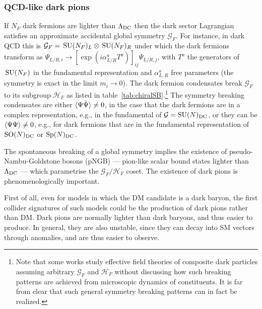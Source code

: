 \subsubsection{QCD-like dark pions}\label{sec:darkpi}
If $N_F$ dark fermions are lighter than $\Lambda_{\rm DC}$ then the dark sector Lagrangian satisfies an approximate accidental global symmetry $\mathcal{G}_F$. For instance, in dark QCD this is $\mathcal{G}_F=\,{\rm SU}(N_F)_L\otimes \,{\rm SU}(N_F)_R$ under which the dark fermions transform as $\Psi_{L/R,i} \to [\exp(i \alpha_{L/R}^a T^a)]_{ij} \Psi_{L/R,j}$, with $T^a$ the generators of $\,{\rm SU}(N_F)$ in the fundamental representation and $\alpha_{L,R}^a$ free parameters (the symmetry is exact in the limit $m_i\to 0$).
The dark fermion condensates break $\mathcal{G}_F$ to its subgroup $\mathcal{H}_F$ as listed in table~\ref{tab:chiralSB}.\footnote{Note that some works study effective field theories of composite dark particles  assuming  arbitrary $\mathcal{G}_F$ and $\mathcal{H}_F$ without discussing how such breaking patterns are achieved from microscopic dynamics of constituents. It is far from clear that such general symmetry breaking patterns can in fact be realized. } The symmetry breaking condensates are either 
$\langle \Psi\bar\Psi\rangle\ne 0$, in the case that the dark fermions are in a complex representation, e.g., in the fundamental of
$\mathcal{G}={\rm SU}(N)_{\rm DC}$, or they can be $\langle \Psi\Psi\rangle\ne 0$, e.g., for dark fermions that are in the 
fundamental representation of
${\rm SO}(N)_{\rm DC}$ or ${\rm Sp}(N)_{\rm DC}$.

 
The spontaneous breaking of a global symmetry implies the existence of pseudo-Nambu-Goldstone bosons (pNGB) --- pion-like scalar bound states lighter than $\Lambda_{\rm DC}$ --- which parametrise the $\mathcal{G}_F/\mathcal{H}_F$ coset. The existence of dark pions is phenomenologically important. 

First of all, even for models in which the DM candidate is a dark baryon, 
the first collider signatures of such models could be the production of dark pions rather than DM. 
Dark pions are normally lighter than dark baryons, and thus easier to produce. 
In general, they are also unstable, since they can decay into SM vectors through anomalies, 
and are thus easier to observe.

\smallskip

